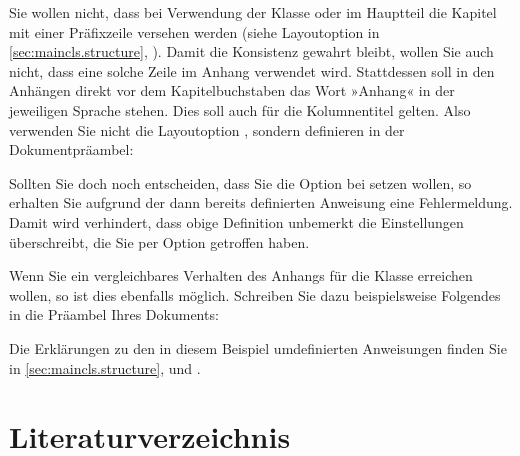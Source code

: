 \begin{Example}
  Sie wollen nicht, dass bei Verwendung der Klasse  oder
   im Hauptteil die Kapitel mit einer Präfixzeile versehen
  werden (siehe Layoutoption 
  in \autoref{sec:maincls.structure},
  ).  Damit die Konsistenz
  gewahrt bleibt, wollen Sie auch nicht, dass eine solche Zeile im Anhang
  verwendet wird. Stattdessen soll in den Anhängen direkt vor dem
  Kapitelbuchstaben das Wort »Anhang« in der jeweiligen Sprache stehen. Dies
  soll auch für die Kolumnentitel gelten. Also verwenden Sie nicht die
  Layoutoption , sondern
  definieren in der Dokumentpräambel:
\begin{lstcode}
  \newcommand*{\appendixmore}{%
    \renewcommand*{\chapterformat}{%
      \appendixname~\thechapter\autodot\enskip}%
    \renewcommand*{\chaptermarkformat}{%
      \appendixname~\thechapter\autodot\enskip}}
\end{lstcode}
  Sollten Sie doch noch entscheiden, dass Sie die Option
   bei
   setzen wollen, so erhalten Sie aufgrund
  der dann bereits definierten Anweisung  eine
  Fehlermeldung. Damit wird verhindert, dass obige Definition unbemerkt die
  Einstellungen überschreibt, die Sie per Option getroffen haben.

  Wenn Sie ein vergleichbares Verhalten des Anhangs für die Klasse
   erreichen wollen, so ist dies ebenfalls möglich. Schreiben
  Sie dazu beispielsweise Folgendes in die  Präambel Ihres Dokuments:
\begin{lstcode}[moretexcs={ifthenelse,equal}]
  \newcommand*{\appendixmore}{%
    \renewcommand*{\sectionformat}{%
      \appendixname~\thesection\autodot\enskip}%
    \renewcommand*{\sectionmarkformat}{%
      \appendixname~\thesection\autodot\enskip}}
\end{lstcode}

  Die Erklärungen zu den in diesem Beispiel umdefinierten Anweisungen finden
  Sie in \autoref{sec:maincls.structure},
   und
  .
\end{Example}%
%
\EndIndexGroup
\ExampleEndFix


\section{Literaturverzeichnis}

